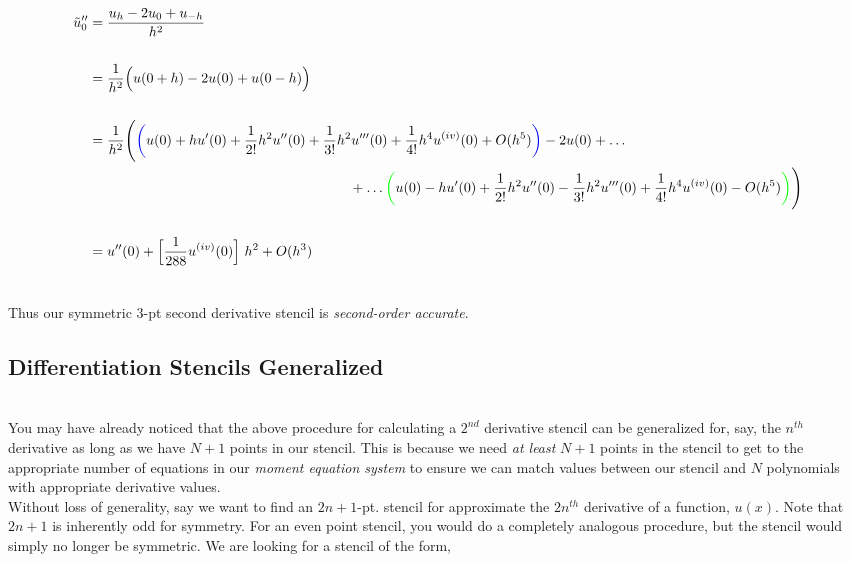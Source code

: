 \documentclass[paper=a4, fontsize=11pt]{scrartcl} %
\numberwithin{equation}{section} %
\numberwithin{figure}{section} %
\numberwithin{table}{section} %
\begin{document}
\begin{align}
\nonumber
\begin{split}
\tilde{u}_0'' &= \frac{ u_h - 2u_0 + u_{-h} }{h^2} \\ \\
                    &= \frac{1}{h^2}\Big( u(0+h) - 2 u(0) + u(0-h) \Big)\\ \\
                    &=\frac{1}{h^2}\Bigg(  \textcolor{blue}{\bigg(} u(0) + hu'(0) + \frac{1}{2!}h^2 u''(0) +  \frac{1}{3!}h^2 u'''(0) + \frac{1}{4!}h^4 u^{(iv)}(0) + O(h^5) \textcolor{blue}{\bigg)} - 2 u(0) +\ldots \\ 
                    &\ \ \ \ \ \ \  \ \ \ \ \ \ \ \ \  \ \ \ \ \ \ \ \ \ \ \ \ \ \ \  \ \ \ \ \ \ \ \ \ \ \ \ \ \ \ \ \ \ \ \ \ \ \ \ \  +\ldots \textcolor{green}{\bigg(} u(0) - hu'(0) + \frac{1}{2!}h^2 u''(0) - \frac{1}{3!}h^2 u'''(0) +  \frac{1}{4!}h^4 u^{(iv)}(0) - O(h^5) \textcolor{green}{\bigg)} \Bigg)\\ \\
                    &=u''(0) + \Big[ \frac{1}{288} u^{(iv)}(0) \Big]\ h^2 + O(h^3)\\ \\
\end{split}
\end{align}

Thus our symmetric $3$-pt second derivative stencil is \emph{second-order accurate}.\\

\subsection{Differentiation Stencils Generalized}

$ $\\

You may have already noticed that the above procedure for calculating a $2^{nd}$ derivative stencil can be generalized for, say, the $n^{th}$ derivative as long as we have $N+1$ points in our stencil. This is because we need \emph{at least} $N+1$ points in the stencil to get to the appropriate number of equations in our \emph{moment equation system} to ensure we can match values between our stencil and $N$ polynomials with appropriate derivative values. \\

Without loss of generality, say we want to find an $2n+1$-pt. stencil for approximate the $2n^{th}$ derivative of a function, $u(x).$ Note that $2n+1$ is inherently odd for symmetry. For an even point stencil, you would do a completely analogous procedure, but the stencil would simply no longer be symmetric. We are looking for a stencil of the form, 
\end{document}
